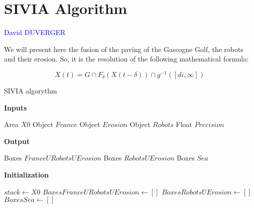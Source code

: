 
\section{SIVIA Algorithm}

\vspace{0.3 cm}
	
	\textcolor{blue} {David DUVERGER}
	
	\vspace{0.5 cm}
	
	We will present here the fusion of the paving of the Gascogne Golf, the robots and their erosion. So, it is the resolution of the following mathematical formula:
	
	$$X(t) = G \cap F_{\delta}(X(t-\delta)) \cap g^{-1}([di,\infty])$$
	

\begin{algorithm}
  \caption{SIVIA algorythm}
  \vspace{0.5 cm}
  \textbf{Inputs}%
  \begin{algorithmic}[1]
    \STATE Area $X0$
    \STATE Object $France$
    \STATE Object $Erosion$
    \STATE Object $Robots$
    \STATE Float $Precision$
  \end{algorithmic}
  \bigskip

  \textbf{Output}%
  \begin{algorithmic}[1]

    \STATE Boxes $France U Robots U Erosion$
    \STATE Boxes $Robots U Erosion$
    \STATE Boxes $Sea$
  \end{algorithmic}
  \bigskip
  
  \textbf{Initialization}%
  \begin{algorithmic}[1]
   	\STATE $stack\gets X0$
	\STATE $BoxesFranceURobotsUErosion\gets []$
	\STATE $BoxesRobotsUErosion\gets []$
	\STATE $BoxesSea\gets []$
  \end{algorithmic}
  
\end{algorithm}




\newpage


